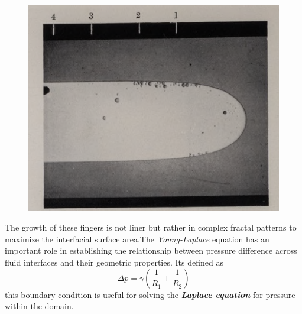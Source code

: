 \documentclass[12pt,a4paper]{article}
\begin{document}
\begin{multicols}{2}
\begin{figure}[H]
\centering
\includegraphics[width=\linewidth]{Finger_001.png}

\label{fig:saffman-instability-finger}

\end{figure}
\end{multicols} 

\newpage

\begin{multicols}{2}
The growth of these fingers is not liner but rather in complex fractal patterns to maximize the interfacial surface area.The \textit{Young-Laplace} equation has an important role in establishing the relationship between pressure difference across fluid interfaces and their geometric properties. Its defined as \[
\Delta p = \gamma \left( \frac{1}{R_1} + \frac{1}{R_2} \right)
\]
this boundary condition is useful for solving the \textit{\textbf{Laplace equation}} for pressure within the domain.


\end{multicols}
\end{document}
